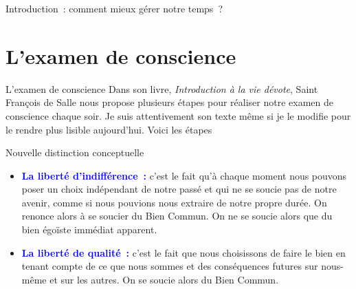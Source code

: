 \documentclass[11pt,xcolor=dvipsname,ignorenonframetext,handout]{beamer}
\begin{document}
\begin{frame}{Introduction~: comment mieux gérer notre temps~?}
\section{L'examen de conscience}
\begin{frame}{L'examen de conscience}
\rightskip=0pt\leftskip=0pt
Dans son livre, \emph{Introduction à la vie dévote}, Saint François de Salle nous propose plusieurs étapes pour réaliser notre examen de conscience chaque soir. Je suis attentivement son texte même si je le modifie pour le rendre plus lisible aujourd'hui. Voici les étapes
\end{frame}
\begin{frame}{Nouvelle distinction conceptuelle}
    \begin{itemize}
        \rightskip=0pt\leftskip=0pt
        \item \textcolor{blue}{\textbf{La liberté d'indifférence~:}} c'est le fait qu'à chaque moment nous pouvons poser un choix indépendant de notre passé et qui ne se soucie pas de notre avenir, comme si nous pouvions nous extraire de notre propre durée. On renonce alors à se soucier du Bien Commun. On ne se soucie alors que du bien égoïste immédiat apparent.
        \item \textcolor{blue}{\textbf{La liberté de qualité~:}} c'est le fait que nous choisissons de faire le bien en tenant compte de ce que nous sommes et des conséquences futures sur nous-même et sur les autres. On se soucie alors du Bien Commun.
    \end{itemize}

\end{frame}
\end{frame}
\end{document}
